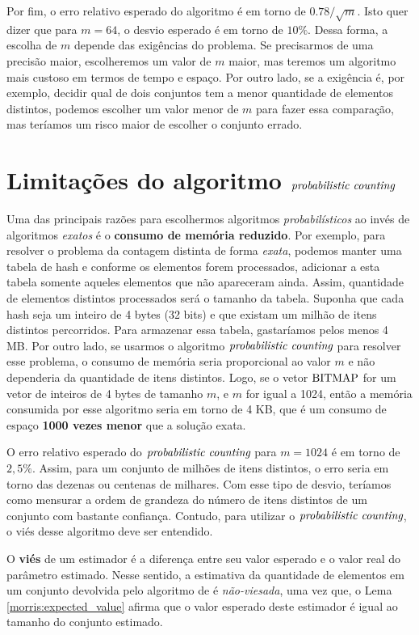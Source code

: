 Por fim, o erro relativo esperado do algoritmo  é em torno de $0.78 / \sqrt{m}$. Isto quer 
dizer que para $m = 64$, o desvio esperado é em torno de $10\%$. Dessa forma, a escolha de $m$ depende das exigências do 
problema. Se precisarmos de uma precisão maior, escolheremos um valor de $m$  maior, mas teremos um algoritmo mais 
custoso em termos de tempo e espaço. Por outro lado, se a exigência é, por exemplo, decidir qual de dois conjuntos tem a 
menor quantidade de elementos distintos, podemos escolher um valor menor de $m$ para fazer essa comparação, mas teríamos 
um risco maior de escolher o conjunto errado.

\section{Limitações do algoritmo $\textit{probabilistic counting}$}

Uma das principais razões para escolhermos algoritmos \textit{probabilísticos} ao invés de algoritmos \textit{exatos} é 
o \textbf{consumo de memória reduzido}. Por exemplo, para resolver o problema da contagem distinta de forma 
\textit{exata}, podemos manter uma tabela de hash e conforme os elementos forem processados, adicionar a esta tabela 
somente aqueles elementos que não apareceram ainda. Assim,  quantidade de elementos distintos processados será o tamanho 
da tabela. Suponha que cada hash seja um inteiro de 4 bytes (32 bits) e que existam um milhão de itens distintos 
percorridos. Para armazenar essa tabela, gastaríamos pelos menos 4 MB. Por outro lado, se usarmos o algoritmo 
$\textit{probabilistic counting}$ para resolver esse problema, o consumo de memória seria proporcional ao valor $m$ e não dependeria da 
quantidade de itens distintos. Logo, se o vetor $\text{BITMAP}$ for um vetor de inteiros de 4 bytes de tamanho $m$, e 
$m$ for igual a 1024, então a memória consumida por esse algoritmo seria em torno de 4 KB, que é um consumo de espaço
\textbf{1000 vezes menor} que a solução exata.

O erro relativo esperado do $\textit{probabilistic counting}$ para $m = 1024$ é em torno de $2{,}5\%$. Assim, para um conjunto de milhões de 
itens distintos, o erro seria em torno das dezenas ou centenas de milhares. Com esse tipo de desvio, teríamos como 
mensurar a ordem de grandeza do número de itens distintos de um conjunto com bastante confiança. Contudo, para utilizar
o $\textit{probabilistic counting}$, o viés desse algoritmo deve ser entendido.

O \textbf{viés} de um estimador é a diferença entre seu valor esperado e o valor real do parâmetro estimado. 
Nesse sentido, a estimativa da quantidade de elementos em um conjunto devolvida pelo algoritmo de  é 
\textit{não-viesada}, uma vez que, o Lema \ref{morris:expected_value} afirma que o valor esperado deste estimador é 
igual ao tamanho do conjunto estimado.

